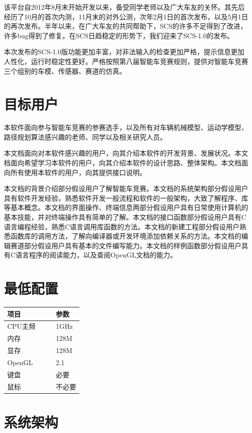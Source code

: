\documentclass[titlepage,a4paper]{ctexart}
\begin{document}
该平台自2012年8月末开始开发以来，备受同学老师以及广大车友的关怀。其先后经历了10月的首次内测，11月末的对外公测，次年2月1日的首次发布，以及5月1日的再次发布。半年以来，在广大车友的共同帮助下，SCS的许多不足得到了改进，许多bug得到了修复。在SCS日趋稳定的形势下，我们迎来了SCS-1.0的发布。

本次发布的SCS-1.0版功能更加丰富，对非法输入的检查更加严格，提示信息更加人性化，运行时稳定性更好。严格按照第八届智能车竞赛规则，提供对智能车竞赛三个组别的车模、传感器、赛道的仿真。

\section{目标用户}
本软件面向参与智能车竞赛的参赛选手，以及所有对车辆机械模型、运动学模型、路径规划算法感兴趣的老师、同学以及相关研究人员。

本文档面向对本软件感兴趣的用户，向其介绍本软件的开发背景、发展状况。本文档面向希望学习本软件的用户，向其介绍本软件的设计思路、整体架构。本文档面向所有使用本软件的用户，向其提供接口说明。

本文档的背景介绍部分假设用户了解智能车竞赛。本文档的系统架构部分假设用户具有软件开发经验，熟悉软件开发一般流程和软件的一般架构，大致了解程序、库等基本概念。本文档的界面操作、终端信息两部分假设用户具有日常使用计算机的基本技能，并对终端操作具有简单的了解。本文档的接口函数部分假设用户具有C语言编程经验，熟悉C语言调用库函数的方法。本文档的新建工程部分假设用户熟悉函数库的调用方法，了解向编译器或开发环境添加依赖关系的方法。本文档的编辑赛道部分假设用户具有基本的文件编写能力。本文档的样例函数部分假设用户具有C语言程序的阅读能力，以及查阅OpenGL文档的能力。


\section{最低配置}
\begin{center}
\begin{tabular}{lll}
\hline
项目	&　& 参数 \\
\hline
CPU主频	& & 1GHz \\
内存	& & 128M \\
显存	& & 128M \\
OpenGL	& & 2.1  \\
键盘	& & 必要 \\
鼠标	& & 不必要 \\
\hline
\end{tabular}
\end{center}

\section{系统架构}
\end{document}
